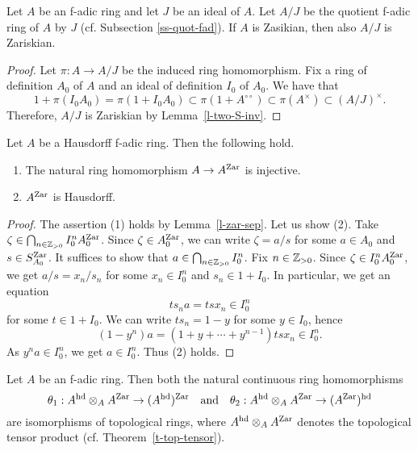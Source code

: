 \begin{lem}\label{l-zar-quot}
Let $A$ be an f-adic ring and let $J$ be an ideal of $A$. 
Let $A/J$ be the quotient f-adic ring of $A$ by $J$ (cf. Subsection \ref{ss-quot-fad}). 
If $A$ is Zasikian, then also $A/J$ is Zariskian. 
\end{lem}


\begin{proof}
Let $\pi:A \to A/J$ be the induced ring homomorphism. 
Fix a ring of definition $A_0$ of $A$ 
and an ideal of definition $I_0$ of $A_0$. 
We have that 
$$1+\pi(I_0A_0)=\pi(1+I_0A_0) \subset \pi(1+A^{\circ\circ}) 
\subset \pi(A^{\times}) \subset (A/J)^{\times}.$$  
Therefore, $A/J$ is Zariskian by Lemma~\ref{l-two-S-inv}. 
\end{proof}




\begin{lem}\label{l-hd-zar}
Let $A$ be a Hausdorff f-adic ring. 
Then the following hold. 
\begin{enumerate}
\item The natural ring homomorphism $A \to A^{{\operatorname{Zar}}}$ is injective. 
\item $A^{{\operatorname{Zar}}}$ is Hausdorff. 
\end{enumerate}
\end{lem}

\begin{proof}
The assertion (1) holds by Lemma~\ref{l-zar-sep}. 
Let us show (2). 
Take $\zeta \in \bigcap_{n \in \mathbb{Z}_{>0}} I_0^n A_0^{{\operatorname{Zar}}}$. 
Since $\zeta \in A_0^{{\operatorname{Zar}}}$, 
we can write $\zeta=a/s$ for some $a \in A_0$ and $s \in S_{A_0}^{{\operatorname{Zar}}}$. 
It suffices to show that $a \in \bigcap_{n \in \mathbb{Z}_{>0}} I_0^n$. 
Fix $n \in \mathbb{Z}_{>0}$. 
Since $\zeta \in I_0^nA_0^{{\operatorname{Zar}}}$, we get 
$a/s=x_n/s_n$ for some $x_n \in I_0^n$ and $s_n \in 1+I_0$. 
In particular, we get an equation 
$$ts_na=tsx_n \in I_0^n$$
for some $t \in 1+I_0$. 
We can write $ts_n=1-y$ for some $y \in I_0$, hence 
$$(1-y^{n})a=(1+y+\cdots+y^{n-1})tsx_n \in I_0^n.$$
As $y^n a \in I_0^n$, we get $a \in I_0^n$. 
Thus (2) holds. 
\end{proof}



\begin{prop}\label{p-hd-zar}
Let $A$ be an f-adic ring. 
Then both the natural continuous ring homomorphisms 
$$\theta_1:A^{{\operatorname{hd}}} \otimes_A A^{{\operatorname{Zar}}} \to (A^{{\operatorname{hd}}})^{{\operatorname{Zar}}} 
\quad\text{and}\quad
\theta_2:A^{{\operatorname{hd}}} \otimes_A A^{{\operatorname{Zar}}} \to (A^{{\operatorname{Zar}}})^{{\operatorname{hd}}}$$
are isomorphisms of topological rings, 
where $A^{{\operatorname{hd}}} \otimes_A A^{{\operatorname{Zar}}}$ denotes the topological tensor product (cf. Theorem~\ref{t-top-tensor}). 
\end{prop}

